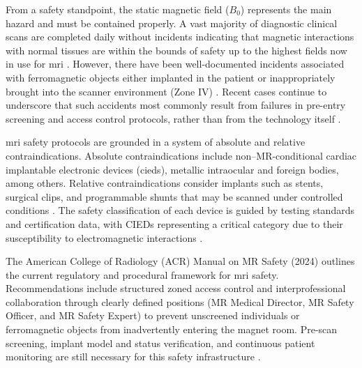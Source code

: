 From a safety standpoint, the static magnetic field ($B_0$) represents the main hazard and must be contained properly. A vast majority of diagnostic clinical scans are completed daily without incidents indicating that magnetic interactions with normal tissues are within the bounds of safety up to the highest fields now in use for \gls{mri} \cite{Schenck2000}.  However, there have been well-documented incidents associated with ferromagnetic objects either implanted in the patient or inappropriately brought into the scanner environment (Zone IV) \cite{Delnoa2019,Sawyer2024}. Recent cases continue to underscore that such accidents most commonly result from failures in pre-entry screening and access control protocols, rather than from the technology itself \cite{CNN2025McAllister}.

\gls{mri} safety protocols are grounded in a system of absolute and relative contraindications. Absolute contraindications include non–MR-conditional cardiac implantable electronic devices (\glspl{cied}), metallic intraocular and foreign bodies, among others. Relative contraindications consider implants such as stents, surgical clips, and programmable shunts that may be scanned under controlled conditions \cite{Ghadimi2025}. The safety classification of each device is guided by testing standards and certification data, with CIEDs representing a critical category due to their susceptibility to electromagnetic interactions \cite{Schenck2000, fda2023testing}. 

The American College of Radiology (ACR) Manual on MR Safety (2024) \cite{ACR_Manual_on_MR_Safety_2024} outlines the current regulatory and procedural framework for \gls{mri} safety. Recommendations include structured zoned access control and interprofessional collaboration through clearly defined positions (MR Medical Director, MR Safety Officer, and MR Safety Expert) to prevent unscreened individuals or ferromagnetic objects from inadvertently entering the magnet room. Pre-scan screening, implant model and status verification, and continuous patient monitoring are still necessary for this safety infrastructure \cite{Ghadimi2025}.



